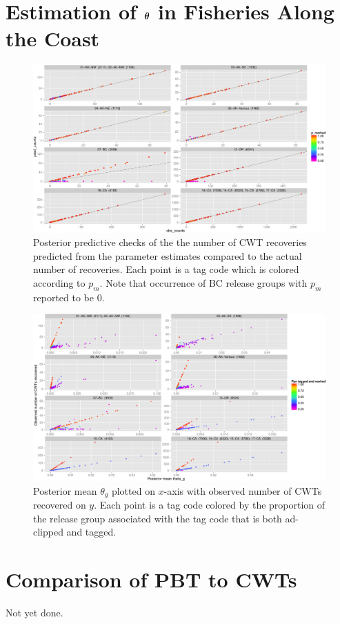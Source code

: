 \documentclass[11pt]{article}
\def\bm#1{\mathpalette\bmstyle{#1}}
\def\bmstyle#1#2{\mbox{\boldmath$#1#2$}}
\newcommand{\btheta}{\bm{\theta}}
\begin{document}
\section{Estimation of $\btheta$ in Fisheries Along the Coast \label{sec:estimation}}

\begin{figure}
\begin{center}
\includegraphics[width=\textwidth]{images/actual_vs_pred_cwt_recoveries_p_marked.pdf}
\end{center}
\caption{Posterior predictive checks of the the number of CWT recoveries predicted from the parameter estimates compared
to the actual number of recoveries.  Each point is a tag code which is colored according to $p_m$.  Note that occurrence
of BC release groups with $p_m$ reported to be 0.}
\end{figure}



\begin{figure}
\begin{center}
\includegraphics[width=\textwidth]{images/post_mean_theta_v_counts_f_marked_times_p_marked.pdf}
\end{center}
\caption{Posterior mean $\theta_g$ plotted on $x$-axis with observed number of CWTs recovered on $y$.  Each point is a
tag code colored by the proportion of the release group associated with the tag code that is both ad-clipped and tagged.}
\end{figure}



\section{Comparison of PBT to CWTs \label{sec:compare}}

Not yet done.



 
\end{document}
